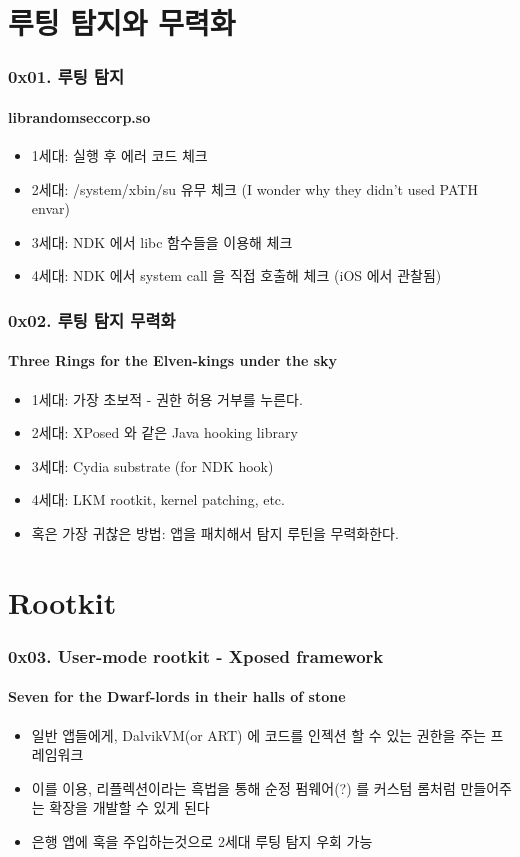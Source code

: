 \section[Section]{루팅 탐지와 무력화}
\begin{frame}
  \frametitle{0x01. 루팅 탐지}
  \framesubtitle{librandomseccorp.so}

  \begin{itemize}
  \item 1세대: 실행 후 에러 코드 체크
  \item 2세대: /system/xbin/su 유무 체크 (I wonder why they didn't used PATH envar)
  \item 3세대: NDK 에서 libc 함수들을 이용해 체크
  \item 4세대: NDK 에서 system call 을 직접 호출해 체크 (iOS 에서 관찰됨)
  \end{itemize}
\end{frame}

\begin{frame}
  \frametitle{0x02. 루팅 탐지 무력화}
  \framesubtitle{Three Rings for the Elven-kings under the sky}

  \begin{itemize}
  \item 1세대: 가장 초보적 - 권한 허용 거부를 누른다.
  \item 2세대: XPosed 와 같은 Java hooking library
  \item 3세대: Cydia substrate (for NDK hook)
  \item 4세대: LKM rootkit, kernel patching, etc.
  \item 혹은 가장 귀찮은 방법: 앱을 패치해서 탐지 루틴을 무력화한다.
  \end{itemize}
\end{frame}

\section[Section]{Rootkit}
\begin{frame}
  \frametitle{0x03. User-mode rootkit - Xposed framework}
  \framesubtitle{Seven for the Dwarf-lords in their halls of stone}

  \begin{itemize}
  \item 일반 앱들에게, DalvikVM(or ART) 에 코드를 인젝션 할 수 있는 권한을 주는 프레임워크
  \item 이를 이용, 리플렉션이라는 흑법을 통해 순정 펌웨어(?) 를 커스텀 롬처럼 만들어주는 확장을 개발할 수 있게 된다
  \item 은행 앱에 훅을 주입하는것으로 2세대 루팅 탐지 우회 가능
  \end{itemize}
\end{frame}

